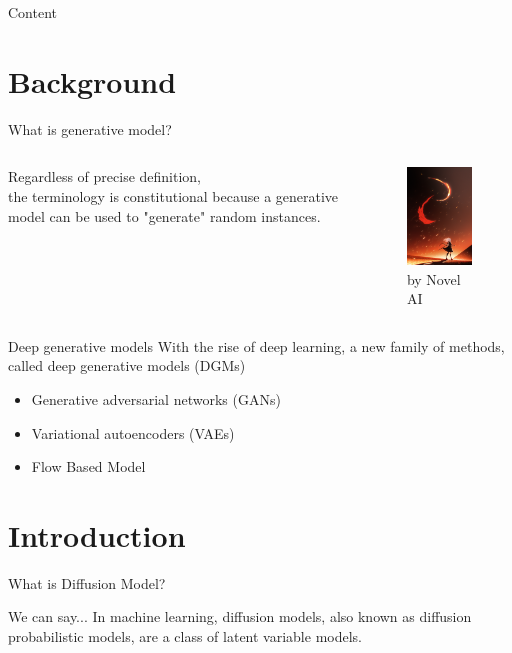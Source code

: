 \documentclass[aspectratio=169]{beamer}
\begin{document}
\begin{frame}{Content}
    \tableofcontents[hideallsubsections]
\end{frame}

\section{Background}

\begin{frame}{What is generative model?}
    \begin{columns}
        \par
        Regardless of precise definition, \\ the terminology is constitutional because a generative model can be used to "generate" random instances.
        \begin{figure}
            \centering
            \includegraphics[width=3.3cm]{../pic/ai1.png}
            \caption{by Novel AI}
        \end{figure}
    \end{columns}
\end{frame}

\begin{frame}{Deep generative models}
    With the rise of deep learning, a new family of methods, called deep generative models (DGMs)
    \begin{itemize}
        \item Generative adversarial networks (GANs)
        \item Variational autoencoders (VAEs)
        \item Flow Based Model
    \end{itemize}
\end{frame}

\section{Introduction}
\begin{frame}{What is Diffusion Model?}
    \begin{block}{We can say...}
        In machine learning, diffusion models, also known as diffusion probabilistic models, are a class of latent variable models.
    \end{block}
\end{frame}
\end{document}
